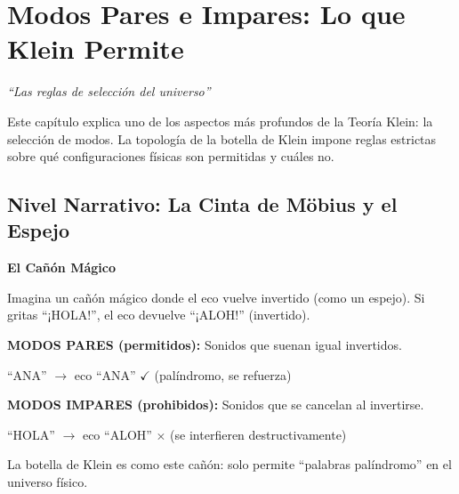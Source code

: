 \chapter{Modos Pares e Impares: Lo que Klein Permite}
\label{cap:modos}

\begin{center}
\textit{``Las reglas de selección del universo''}
\end{center}

\vspace{0.5cm}

\begin{tcolorbox}[colback=white, colframe=kleinblue, boxrule=2pt]
\centering
Este capítulo explica uno de los aspectos más profundos de la Teoría Klein:
la selección de modos. La topología de la botella de Klein impone reglas
estrictas sobre qué configuraciones físicas son permitidas y cuáles no.
\end{tcolorbox}


\section{Nivel Narrativo: La Cinta de Möbius y el Espejo}

\begin{analogiabox}
\textbf{El Cañón Mágico}

Imagina un cañón mágico donde el eco vuelve invertido (como un espejo).
Si gritas ``¡HOLA!'', el eco devuelve ``¡ALOH!'' (invertido).

\textbf{MODOS PARES (permitidos):} Sonidos que suenan igual invertidos.

\begin{center}
``ANA'' $\to$ eco ``ANA'' $\checkmark$ (palíndromo, se refuerza)
\end{center}

\textbf{MODOS IMPARES (prohibidos):} Sonidos que se cancelan al invertirse.

\begin{center}
``HOLA'' $\to$ eco ``ALOH'' $\times$ (se interfieren destructivamente)
\end{center}

La botella de Klein es como este cañón: solo permite ``palabras palíndromo''
en el universo físico.
\end{analogiabox}


